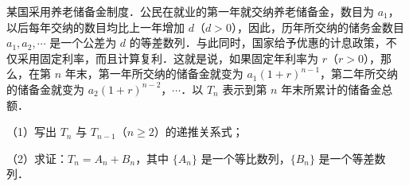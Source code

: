 \begin{question}
某国采用养老储备金制度．公民在就业的第一年就交纳养老储备金，数目为 $a_1$，以后每年交纳的数目均比上一年增加 $d$（$d>0$），因此，历年所交纳的储务金数目 $a_1,a_2,\cdots$ 是一个公差为 $d$ 的等差数列．与此同时，国家给予优惠的计息政策，不仅采用固定利率，而且计算复利．这就是说，如果固定年利率为 $r$（$r>0$），那么，在第 $n$ 年末，第一年所交纳的储备金就变为 $a_1(1+r)^{n-1}$，第二年所交纳的储备金就变为 $a_2(1+r)^{n-2}$，$\cdots$．以 $T_n$ 表示到第 $n$ 年末所累计的储备金总额．

（1）写出 $T_n$ 与 $T_{n-1}$（$n\geqslant2$）的递推关系式；

（2）求证：$T_n=A_n+B_n$，其中 $\{A_n\}$ 是一个等比数列，$\{B_n\}$ 是一个等差数列．

\end{question}